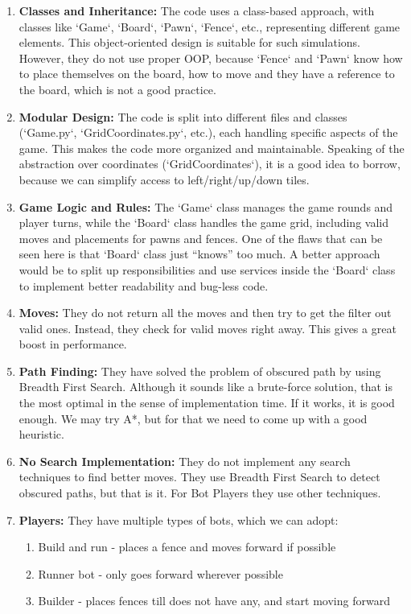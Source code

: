 \documentclass{article}
\begin{document}
\begin{enumerate}
	\item \textbf{Classes and Inheritance:} The code uses a class-based approach, with classes like `Game`, `Board`, `Pawn`, `Fence`, etc., representing different game elements. This object-oriented design is suitable for such simulations. However, they do not use proper OOP, because `Fence` and `Pawn` know how to place themselves on the board, how to move and they have a reference to the board, which is not a good practice.
	\item \textbf{Modular Design:} The code is split into different files and classes (`Game.py`, `GridCoordinates.py`, etc.), each handling specific aspects of the game. This makes the code more organized and maintainable. Speaking of the abstraction over coordinates (`GridCoordinates`), it is a good idea to borrow, because we can simplify access to left/right/up/down tiles. 
	\item \textbf{Game Logic and Rules:} The `Game` class manages the game rounds and player turns, while the `Board` class handles the game grid, including valid moves and placements for pawns and fences. One of the flaws that can be seen here is that `Board` class just “knows” too much. A better approach would be to split up responsibilities and use services inside the `Board` class to implement better readability and bug-less code.
	\item \textbf{Moves:} They do not return all the moves and then try to get the filter out valid ones. Instead, they check for valid moves right away. This gives a great boost in performance.
	\item \textbf{Path Finding:} They have solved the problem of obscured path by using Breadth First Search. Although it sounds like a brute-force solution, that is the most optimal in the sense of implementation time. If it works, it is good enough. We may try A*, but for that we need to come up with a good heuristic. 
	\item \textbf{No Search Implementation:} They do not implement any search techniques to find better moves. They use Breadth First Search to detect obscured paths, but that is it. For Bot Players they use other techniques. 
	\item \textbf{Players:} They have multiple types of bots, which we can adopt:
	\begin{enumerate}
		\item Build and run - places a fence and moves forward if possible
		\item Runner bot - only goes forward wherever possible
		\item Builder - places fences till does not have any, and start moving forward
	\end{enumerate}
   
\end{enumerate}
\end{document}
